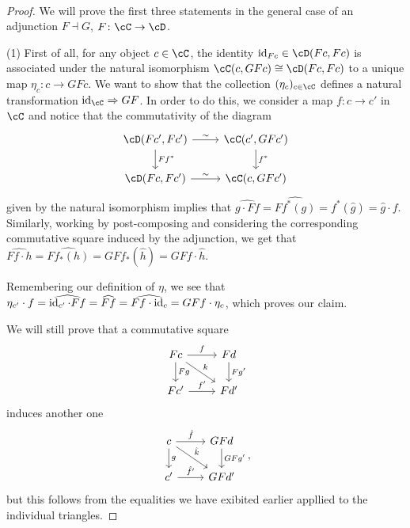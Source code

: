 \documentclass[a4paper,11pt,openany]{scrartcl}
\begin{document}
~\\
\begin{proof}
    We will prove the first three statements in the general case of an adjunction
    $F\dashv G$, $F\colon\cC\rightarrow\cD$.

    (1) First of all, for any object $c\in\cC$, the identity $\id_{Fc}\in\cD(Fc,Fc)$
    is associated under the natural isomorphism $\cC(c,GFc)\cong\cD(Fc,Fc)$ to a
    unique map $\eta_c\colon c\rightarrow GFc$. We want to show that the
    collection $(\eta_c)_{c\in\cC}$ defines a natural transformation
    $\id_\cC\Rightarrow GF$. In order to do this, we consider a map
    $f\colon c\rightarrow c'$ in $\cC$ and notice that the commutativity of the
    diagram
    \[
        \begin{tikzcd}
            \cD(Fc',Fc')\ar[r, "\sim"]\ar[d, "Ff^*"]
            & \cC(c',GFc')\ar[d, "f^*"] \\
            \cD(Fc,Fc')\ar[r, "\sim"]
            & \cC(c,GFc')
        \end{tikzcd}
    \]
    given by the natural isomorphism implies that
    $\widehat{g\cdot Ff}=\widehat{Ff^*(g)}=f^*(\hat{g})=\hat{g}\cdot f$.
    Similarly, working by post-composing and considering the corresponding
    commutative square induced by the adjunction, we get that
    $\widehat{Ff\cdot h}=\widehat{Ff_*(h)}=GFf_*(\hat{h})=GFf\cdot\hat{h}$.

    Remembering our definition of $\eta$, we see that $\eta_{c'}\cdot
    f=\widehat{\operatorname{id}_{c'}\cdot
    Ff}=\widehat{Ff}=\widehat{Ff\cdot\operatorname{id}_c}=GFf\cdot\eta_c$, which proves our
    claim.

    We will still prove that a commutative square
    \[
        \begin{tikzcd}
            Fc\ar[r, "f"]\ar[dr, "k"]\ar[d, "Fg"]
            & Fd\ar[d, "Fg'"] \\
            Fc'\ar[r, "f'"]
            & Fd'
        \end{tikzcd}
    \]
    induces another one
    \[
        \begin{tikzcd}
            c\ar[r, "\hat{f}"]\ar[dr, "\hat{k}"]\ar[d, "g"]
            & GFd\ar[d, "GFg'"] \\
            c'\ar[r, "\hat{f'}"]
            & GFd'
        \end{tikzcd},
    \]
    but this follows from the equalities we have exibited earlier appllied to
    the individual triangles.


\end{proof}
\end{document}

